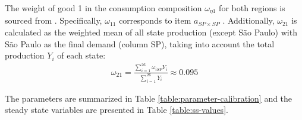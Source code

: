 \documentclass[../thesis.tex]{subfiles}
\begin{document}
\textcolor{blue}{}The weight of good 1 in the consumption composition $\omega_{\eta 1}$ for both regions is sourced from \textcite[Table 3, p.442]{haddad_matriz_2017}. Specifically, $\omega_{11}$ corresponds to item $a_{SP\times SP}$ \label{eq:omega-e1}. Additionally, $\omega_{21}$ is calculated as the weighted mean of all state production (except São Paulo) with São Paulo as the final demand (column SP), taking into account the total production $Y_{i}$ of each state:
\begin{align}
	\omega_{21} = \frac{\sum_{i=1}^{26} \omega_{iSP} Y_i}{\sum_{i=1}^{26} Y_i} \approx 0.095 \label{eq:omega-e2}
\end{align}

The parameters are summarized in Table \eqref{table:parameter-calibration} and the steady state variables are presented in Table \eqref{table:ss-values}.


\newpage



\end{document}
